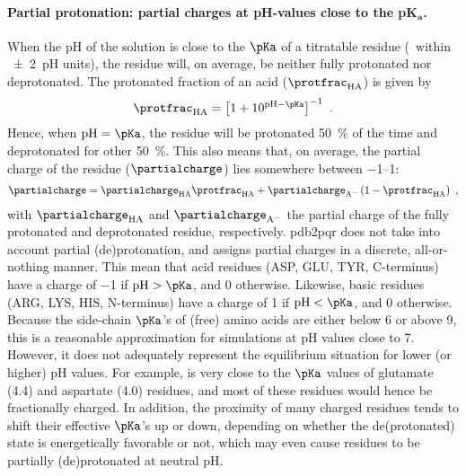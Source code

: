 \paragraph{Partial protonation: partial charges at pH-values close to the p$\boldsymbol{K}_{\mathbf{a}}$.}
%
%
When the pH of the solution is close to the $\pKa$ of a titratable residue (\ie~within \num{\pm2}~pH units),
the residue will, on average, be neither fully protonated nor deprotonated. The protonated fraction of an acid
($\protfrac_{\mathrm{HA}}$) is given by 
%
\begin{align}\label{eq:pka_protonation}
  \protfrac_{\mathrm{HA}} = \left[ 1 + 10^{\mathrm{pH} - \pKa} \right]^{-1}
  \text{ .}
\end{align}
%
Hence, when $\mathrm{pH} = \pKa$, the residue will be protonated \SI{50}{\percent} of the time and
deprotonated for other \SI{50}{\percent}. This also means that, on average, the partial charge of the residue
($\partialcharge$) lies somewhere between \SIrange{-1}{+1}{\ec}:
%
\begin{align}\label{eq:pka_partial_charge}
  \partialcharge = \partialcharge_{\mathrm{HA}} \protfrac_{\mathrm{HA}}
                    + \partialcharge_{\mathrm{A}^{-}} \left( 1 - \protfrac_{\mathrm{HA}} \right)
  \text{ ,}
\end{align}
%
with $\partialcharge_{\mathrm{HA}}$ and $\partialcharge_{\mathrm{A}^{-}}$ the partial charge of the fully
protonated and deprotonated residue, respectively. \gls{pdb2pqr} does not take into account partial
(de)protonation, and assigns partial charges in a discrete, all-or-nothing manner. This mean that acid
residues (ASP, GLU, TYR, C-terminus) have a charge of \SI{-1}{\ec} if $\mathrm{pH} > \pKa$, and \SI{0}{\ec}
otherwise. Likewise, basic residues (ARG, LYS, HIS, N-terminus) have a charge of \SI{+1}{\ec} if $\mathrm{pH}
< \pKa$, and \SI{0}{\ec} otherwise. Because the side-chain $\pKa$'s of (free) amino acids are either below 6
or above 9, this is a reasonable approximation for simulations at pH values close to 7. However, it does not
adequately represent the equilibrium situation for lower (or higher) pH values. For example,  is very
close to the $\pKa$ values of glutamate (\num{4.4}) and aspartate (4.0) residues, and most of these residues
would hence be fractionally charged. In addition, the proximity of many charged residues tends to shift their
effective $\pKa$'s up or down, depending on whether the de(protonated) state is energetically favorable or
not, which may even cause residues to be partially (de)protonated at neutral pH.

